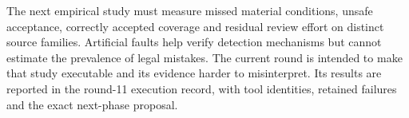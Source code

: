 The next empirical study must measure missed material conditions, unsafe
acceptance, correctly accepted coverage and residual review effort on distinct
source families. Artificial faults help verify detection mechanisms but cannot
estimate the prevalence of legal mistakes. The current round is intended to make
that study executable and its evidence harder to misinterpret. Its results are
reported in the round-11 execution record, with tool identities, retained failures
and the exact next-phase proposal.
